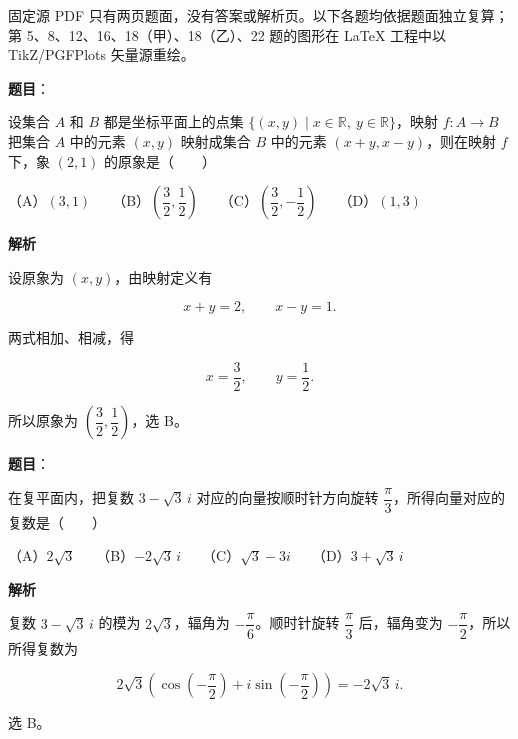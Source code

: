 

\begin{gktip}
固定源 PDF 只有两页题面，没有答案或解析页。以下各题均依据题面独立复算；第 5、8、12、16、18（甲）、18（乙）、22 题的图形在 LaTeX 工程中以 TikZ/PGFPlots 矢量源重绘。
\end{gktip}


\begin{answer}

\textbf{题目}：

设集合 $A$ 和 $B$ 都是坐标平面上的点集 $\{(x,y)\mid x\in\mathbb R,\ y\in\mathbb R\}$，映射 $f:A\to B$ 把集合 $A$ 中的元素 $(x,y)$ 映射成集合 $B$ 中的元素 $(x+y,x-y)$，则在映射 $f$ 下，象 $(2,1)$ 的原象是\mbox{（　　）}

（A）$(3,1)$　　（B）$\left(\dfrac32,\dfrac12\right)$　　（C）$\left(\dfrac32,-\dfrac12\right)$　　（D）$(1,3)$

\textbf{解析}

设原象为 $(x,y)$，由映射定义有

\nopagebreak[4]
\[
x+y=2,\qquad x-y=1.
\]

两式相加、相减，得

\nopagebreak[4]
\[
x=\frac32,\qquad y=\frac12.
\]

所以原象为 $\left(\dfrac32,\dfrac12\right)$，选 B。


\end{answer}
\begin{answer}

\textbf{题目}：

在复平面内，把复数 $3-\sqrt3\,i$ 对应的向量按顺时针方向旋转 $\dfrac\pi3$，所得向量对应的复数是\mbox{（　　）}

（A）$2\sqrt3$　　（B）$-2\sqrt3\,i$　　（C）$\sqrt3-3i$　　（D）$3+\sqrt3\,i$

\textbf{解析}

复数 $3-\sqrt3\,i$ 的模为 $2\sqrt3$，辐角为 $-\dfrac\pi6$。顺时针旋转 $\dfrac\pi3$ 后，辐角变为 $-\dfrac\pi2$，所以所得复数为

\nopagebreak[4]
\[
2\sqrt3\left(\cos\left(-\frac\pi2\right)+i\sin\left(-\frac\pi2\right)\right)
=-2\sqrt3\,i.
\]

选 B。


\end{answer}
